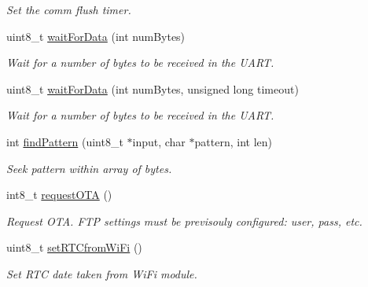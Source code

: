 \begin{DoxyCompactItemize}
\begin{DoxyCompactList}\small\item\em Set the comm flush timer. \end{DoxyCompactList}\item 
uint8\+\_\+t \hyperlink{class_wasp_w_i_f_i_a953dcf150e341b5f10ca6b88828d1c80}{wait\+For\+Data} (int num\+Bytes)
\begin{DoxyCompactList}\small\item\em Wait for a number of bytes to be received in the U\+A\+RT. \end{DoxyCompactList}\item 
uint8\+\_\+t \hyperlink{class_wasp_w_i_f_i_a910136ffa5e23101a4b0df10cbf4e7cf}{wait\+For\+Data} (int num\+Bytes, unsigned long timeout)
\begin{DoxyCompactList}\small\item\em Wait for a number of bytes to be received in the U\+A\+RT. \end{DoxyCompactList}\item 
int \hyperlink{class_wasp_w_i_f_i_adedf6adf096bc02e609fac1187498464}{find\+Pattern} (uint8\+\_\+t $\ast$input, char $\ast$pattern, int len)
\begin{DoxyCompactList}\small\item\em Seek pattern within array of bytes. \end{DoxyCompactList}\item 
int8\+\_\+t \hyperlink{class_wasp_w_i_f_i_a40f9097c4cd371db65ad68b860511887}{request\+O\+TA} ()
\begin{DoxyCompactList}\small\item\em Request O\+TA. F\+TP settings must be previsouly configured\+: user, pass, etc. \end{DoxyCompactList}\item 
uint8\+\_\+t \hyperlink{class_wasp_w_i_f_i_a676f667adeb0200cb56600a4b536f400}{set\+R\+T\+Cfrom\+Wi\+Fi} ()
\begin{DoxyCompactList}\small\item\em Set R\+TC date taken from Wi\+Fi module. \end{DoxyCompactList}\end{DoxyCompactItemize}

